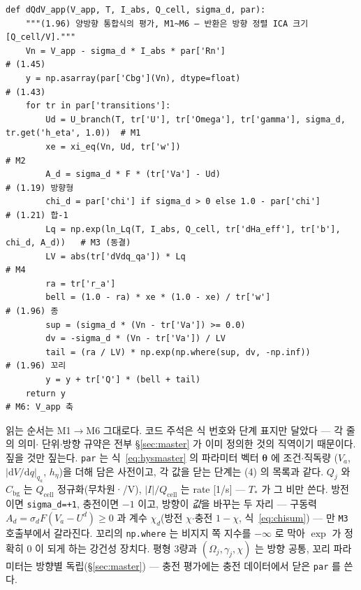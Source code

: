 \documentclass[11pt,a4paper]{article}
\newcommand{\dd}{\mathrm{d}}
\newcommand{\cell}{\mathrm{cell}}
\newcommand{\bg}{\mathrm{bg}}
\begin{document}
\begin{small}
\begin{verbatim}
def dQdV_app(V_app, T, I_abs, Q_cell, sigma_d, par):
    """(1.96) 양방향 통합식의 평가, M1~M6 — 반환은 방향 정렬 ICA 크기 [Q_cell/V]."""
    Vn = V_app - sigma_d * I_abs * par['Rn']                                       # (1.45)
    y = np.asarray(par['Cbg'](Vn), dtype=float)                                    # (1.43)
    for tr in par['transitions']:
        Ud = U_branch(T, tr['U'], tr['Omega'], tr['gamma'], sigma_d, tr.get('h_eta', 1.0))  # M1
        xe = xi_eq(Vn, Ud, tr['w'])                                                # M2
        A_d = sigma_d * F * (tr['Va'] - Ud)                                        # (1.19) 방향형
        chi_d = par['chi'] if sigma_d > 0 else 1.0 - par['chi']                    # (1.21) 합-1
        Lq = np.exp(ln_Lq(T, I_abs, Q_cell, tr['dHa_eff'], tr['b'], chi_d, A_d))   # M3 (동결)
        LV = abs(tr['dVdq_qa']) * Lq                                               # M4
        ra = tr['r_a']
        bell = (1.0 - ra) * xe * (1.0 - xe) / tr['w']                              # (1.96) 종
        sup = (sigma_d * (Vn - tr['Va']) >= 0.0)
        dv = -sigma_d * (Vn - tr['Va']) / LV
        tail = (ra / LV) * np.exp(np.where(sup, dv, -np.inf))                      # (1.96) 꼬리
        y = y + tr['Q'] * (bell + tail)
    return y                                                                       # M6: V_app 축
\end{verbatim}
\end{small}

읽는 순서는 M1$\to$M6 그대로다. 코드 주석은 식 번호와 단계 표지만 달았다 — 각 줄의 의미$\cdot$
단위$\cdot$방향 규약은 전부 \S\ref{sec:master} 가 이미 정의한 것의 직역이기 때문이다. 짚을 것만
짚는다. \texttt{par} 는 식~\eqref{eq:hysmaster} 의 파라미터 벡터 $\bm\theta$ 에 조건$\cdot$직독량
($V_a$, $|\dd V/\dd q|_{q_a}$, $h_\eta$)을 더해 담은 사전이고, 각 값을 닫는 단계는 (4) 의 목록과
같다. $Q_j$ 와 $C_\bg$ 는 $Q_\cell$ 정규화(무차원·/V), $|I|/Q_\cell$ 는 rate [1/s] — $T_*$ 가
그 비만 쓴다. 방전이면 \texttt{sigma\_d=+1}, 충전이면 $-1$ 이고, 방향이 \emph{값}을 바꾸는 두 자리
— 구동력 $A_d=\sigma_dF(V_a-U^d)\ge0$ 과 계수 $\chi_d$(방전 $\chi$$\cdot$충전 $1-\chi$,
식~\eqref{eq:chisum}) — 만 \texttt{M3} 호출부에서 갈라진다. 꼬리의 \texttt{np.where} 는 비지지
쪽 지수를 $-\infty$ 로 막아 $\exp$ 가 정확히 $0$ 이 되게 하는 강건성 장치다. 평형 3량과
$(\Omega_j,\gamma_j,\chi)$ 는 방향 공통, 꼬리 파라미터는 방향별 독립(\S\ref{sec:master}) —
충전 평가에는 충전 데이터에서 닫은 \texttt{par} 를 쓴다.
\end{document}
